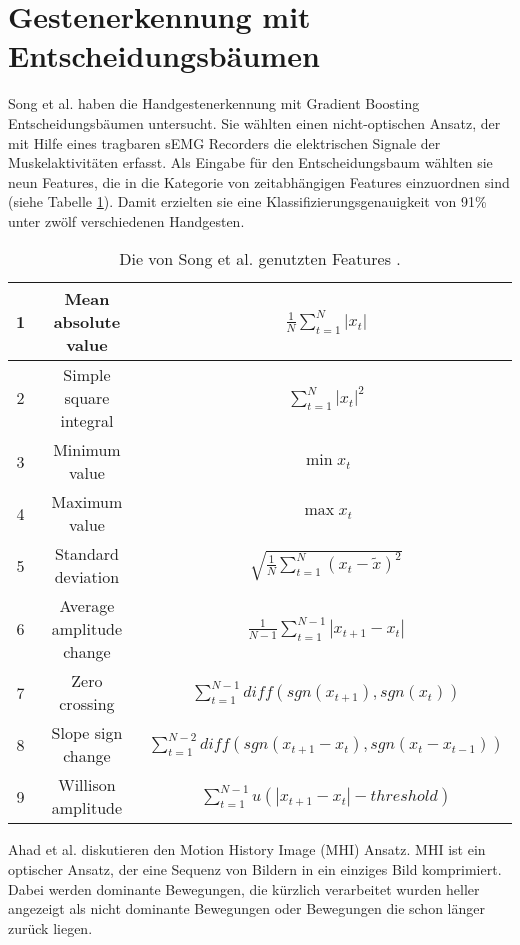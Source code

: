 \section{Gestenerkennung mit Entscheidungsbäumen}
\label{sec:sota_misc}
Song et al. \cite{song2019design} haben die Handgestenerkennung mit Gradient Boosting Entscheidungsbäumen untersucht. Sie wählten einen nicht-optischen Ansatz, der mit Hilfe eines tragbaren sEMG Recorders
die elektrischen Signale der Muskelaktivitäten erfasst. Als Eingabe für den Entscheidungsbaum wählten sie neun Features, die in die Kategorie von zeitabhängigen Features einzuordnen sind
(siehe Tabelle \ref{tab:songFeatures}). Damit erzielten sie eine Klassifizierungsgenauigkeit von 91\% unter zwölf verschiedenen Handgesten.
\begin{table}[h!]
    \centering
    \begin{tabular}{ c | c | c }
        \hline
        \hline
        1 & Mean absolute value & $\frac{1}{N}\sum^N_{t=1} |x_t|$ \\\hline
        2 & Simple square integral & $\sum^N_{t=1} |x_t|^2$ \\\hline
        3 & Minimum value & $\min x_t$ \\\hline
        4 & Maximum value & $\max x_t$ \\\hline
        5 & Standard deviation & $\sqrt{\frac{1}{N}\sum^N_{t=1}(x_t - \tilde{x})^2}$ \\\hline
        6 & Average amplitude change & $\frac{1}{N-1}\sum^{N-1}_{t=1} |x_{t + 1} - x_t|$ \\\hline
        7 & Zero crossing & $\sum^{N-1}_{t=1}diff(sgn(x_{t+1}),sgn(x_t))$ \\\hline
        8 & Slope sign change & $\sum^{N-2}_{t=1}diff(sgn(x_{t+1} - x_t),sgn(x_t - x_{t - 1}))$ \\\hline
        9 & Willison amplitude & $\sum^{N-1}_{t=1}u(|x_{t+1} - x_t| - threshold)$ \\
        \hline
        \hline
    \end{tabular}
    \caption{Die von Song et al. genutzten Features \cite{song2019design}.}
    \label{tab:songFeatures}
\end{table}
\newline
\newline
Ahad et al. \cite{ahad2012motion} diskutieren den Motion History Image (MHI) Ansatz. MHI ist ein optischer Ansatz, der eine Sequenz von Bildern in ein einziges Bild komprimiert. Dabei werden dominante Bewegungen, die
kürzlich verarbeitet wurden heller angezeigt als nicht dominante Bewegungen oder Bewegungen die schon länger zurück liegen.
